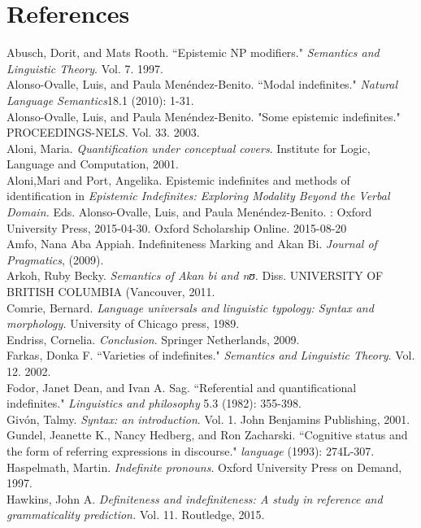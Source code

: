 \documentclass[output=paper,
modfonts
]{langsci/langscibook}
\begin{document}
\section*{References}
Abusch, Dorit, and Mats Rooth. ``Epistemic NP modifiers." \emph{Semantics and Linguistic Theory}. Vol. 7. 1997.\\
Alonso-Ovalle, Luis, and Paula Menéndez-Benito. ``Modal indefinites." \emph{Natural Language Semantics}18.1 (2010): 1-31.\\
Alonso-Ovalle, Luis, and Paula Menéndez-Benito. "Some epistemic indefinites." PROCEEDINGS-NELS. Vol. 33. 2003.\\
Aloni, Maria. \emph{Quantification under conceptual covers}. Institute for Logic, Language and Computation, 2001.\\
Aloni,Mari and Port, Angelika. Epistemic indefinites and methods of identification in \emph{Epistemic Indefinites: Exploring Modality Beyond the Verbal Domain.} Eds. Alonso-Ovalle, Luis, and Paula Menéndez-Benito. : Oxford University Press, 2015-04-30. Oxford Scholarship Online. 2015-08-20\\
 Amfo, Nana Aba Appiah. Indefiniteness Marking and Akan Bi. \emph{Journal of Pragmatics}, (2009).\\
Arkoh, Ruby Becky. \emph{Semantics of Akan bi and nʊ.} Diss. UNIVERSITY OF BRITISH COLUMBIA (Vancouver, 2011.\\
Comrie, Bernard. \emph{Language universals and linguistic typology: Syntax and morphology.} University of Chicago press, 1989.\\
Endriss, Cornelia. \emph{Conclusion}. Springer Netherlands, 2009.\\
Farkas, Donka F. ``Varieties of indefinites." \emph{Semantics and Linguistic Theory}. Vol. 12. 2002.\\
Fodor, Janet Dean, and Ivan A. Sag. ``Referential and quantificational indefinites." \emph{Linguistics and philosophy} 5.3 (1982): 355-398.\\
Givón, Talmy. \emph{Syntax: an introduction}. Vol. 1. John Benjamins Publishing, 2001.\\
Gundel, Jeanette K., Nancy Hedberg, and Ron Zacharski. ``Cognitive status and the form of referring expressions in discourse." \emph{language} (1993): 274L-307. \\
 Haspelmath, Martin. \emph{Indefinite pronouns}. Oxford University Press on Demand, 1997.\\
 Hawkins, John A. \emph{Definiteness and indefiniteness: A study in reference and grammaticality prediction.} Vol. 11. Routledge, 2015.
\end{document}
